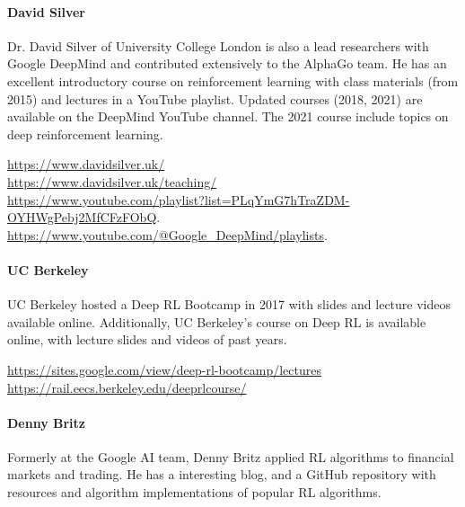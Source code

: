 \paragraph*{David Silver}
Dr. David Silver of University College London is also a lead researchers with Google DeepMind and contributed extensively to the AlphaGo team. He has an excellent introductory course on reinforcement learning with class materials (from 2015) and lectures in a YouTube playlist. Updated courses (2018, 2021) are available on the DeepMind YouTube channel. The 2021 course include topics on deep reinforcement learning. \\

\begin{tcolorbox}[colback=code]
\footnotesize
\url{https://www.davidsilver.uk/} \\

\url{https://www.davidsilver.uk/teaching/} \\

\url{https://www.youtube.com/playlist?list=PLqYmG7hTraZDM-OYHWgPebj2MfCFzFObQ}. \\

\url{https://www.youtube.com/@Google_DeepMind/playlists}.
\end{tcolorbox}

\paragraph*{UC Berkeley}

UC Berkeley hosted a Deep RL Bootcamp in 2017 with slides and lecture videos available online. Additionally, UC Berkeley's course on Deep RL is available online, with lecture slides and videos of past years.

\begin{tcolorbox}[colback=code]
\footnotesize
\url{https://sites.google.com/view/deep-rl-bootcamp/lectures} \\

\url{https://rail.eecs.berkeley.edu/deeprlcourse/}
\end{tcolorbox}


\paragraph*{Denny Britz}

Formerly at the Google AI team, Denny Britz applied RL algorithms to financial markets and trading. He has a interesting blog, and a GitHub repository with resources and algorithm implementations of popular RL algorithms. \\

